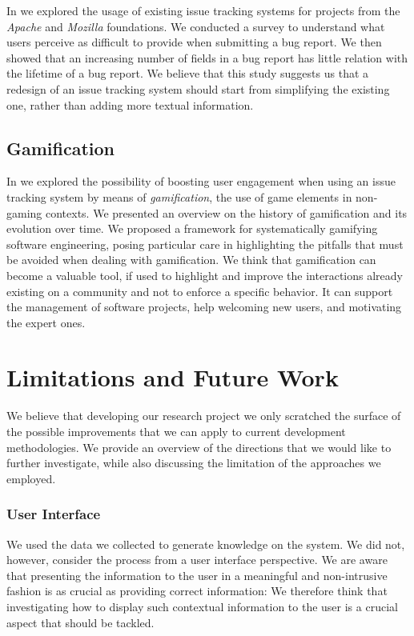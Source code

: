 In  we explored the usage of existing issue tracking systems for projects from the \emph{Apache} and \emph{Mozilla} foundations.
We conducted a survey to understand what users perceive as difficult to provide when submitting a bug report.
We then showed that an increasing number of fields in a bug report has little relation with the lifetime of a bug report.
We believe that this study suggests us that a redesign of an issue tracking system should start from simplifying the existing one, rather than adding more textual information.


\subsection{Gamification}

In  we explored the possibility of boosting user engagement when using an issue tracking system by means of \emph{gamification}, the use of game elements in non-gaming contexts.
We presented an overview on the history of gamification and its evolution over time.
We proposed a framework for systematically gamifying software engineering, posing particular care in highlighting the pitfalls that must be avoided when dealing with gamification.
We think that gamification can become a valuable tool, if used to highlight and improve the interactions already existing on a community and not to enforce a specific behavior.
It can support the management of software projects, help welcoming new users, and motivating the expert ones.



\section{Limitations and Future Work}

We believe that developing our research project we only scratched the surface of the possible improvements that we can apply to current development methodologies.
We provide an overview of the directions that we would like to further investigate, while also discussing the limitation of the approaches we employed.

\subsubsection{User Interface}

We used the data we collected to generate knowledge on the system.
We did not, however, consider the process from a user interface perspective.
We are aware that presenting the information to the user in a meaningful and non-intrusive fashion is as crucial as providing correct information: We therefore think that investigating how to display such contextual information to the user is a crucial aspect that should be tackled.


